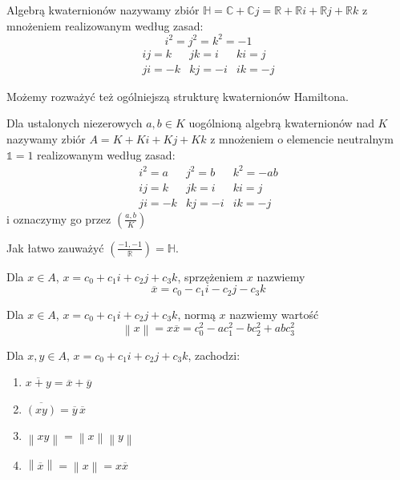 \begin{definicja}
 Algebrą kwaternionów nazywamy zbiór
$\mathbb{H}=\mathbb{C}+\mathbb{C}j=\mathbb{R}+\mathbb{R}i+\mathbb{R}j+\mathbb{R}
k
$ z mnożeniem realizowanym według zasad:
\begin{equation}
i^2=j^2=k^2=-1
\end{equation}
\begin{eqnarray}
ij=k & jk=i & ki=j \\
ji=-k & kj=-i & ik=-j 
\end{eqnarray}
\end{definicja}
Możemy rozważyć też ogólniejszą strukturę kwaternionów Hamiltona.
\begin{definicja}
 Dla ustalonych niezerowych $a,b\in K$ uogólnioną algebrą kwaternionów nad
$K$ nazywamy zbiór
$A=K+Ki+Kj+Kk$ z mnożeniem o elemencie neutralnym $\mathbb{1}=1$ realizowanym
według zasad:
\begin{eqnarray} 
i^2=a & j^2=b & k^2=-ab \\
ij=k & jk=i & ki=j \\
ji=-k & kj=-i & ik=-j 
\end{eqnarray}
i oznaczymy go przez $\left(\frac{a,b}{K}\right) $
\end{definicja}
Jak łatwo zauważyć $\left(\frac{-1,-1}{\mathbb{R}}\right) = \mathbb{H}$.
\begin{definicja}
  Dla $x \in A$, $x=c_0+c_1i+c_2j+c_3k$, sprzężeniem $x$ nazwiemy 
\begin{equation}
\overline{x}=c_0-c_1i-c_2j-c_3k
\end{equation}
\end{definicja}

\begin{definicja}
  Dla $x \in A$, $x=c_0+c_1i+c_2j+c_3k$, normą $x$ nazwiemy wartość
\begin{equation}
\left\|x \right\| =x\overline{x}=c_0^2-ac_1^2-bc_2^2 +abc_3^2
\end{equation}
\end{definicja}

\begin{wlasnosci}
 Dla $x,y \in A$, $x=c_0+c_1i+c_2j+c_3k$, zachodzi:
\begin{enumerate}
\item $\overline{x+y}=\overline{x}+\overline{y}$
\item $\overline{ \left( xy \right) }=\overline{y} \, \overline{x}$
\item $\left\|xy \right\| =\left\|x \right\| \left\|y \right\|$
\item $\left\| \overline{x} \right\|=\left\|x \right\|  =x\overline{x}$
\end{enumerate}
\end{wlasnosci}

